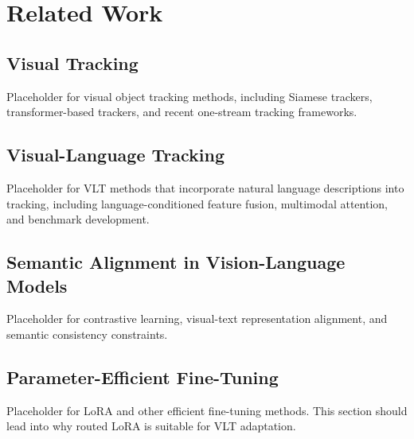 \section{Related Work}
\subsection{Visual Tracking}
Placeholder for visual object tracking methods, including Siamese trackers, transformer-based trackers, and recent one-stream tracking frameworks.

\subsection{Visual-Language Tracking}
Placeholder for VLT methods that incorporate natural language descriptions into tracking, including language-conditioned feature fusion, multimodal attention, and benchmark development.

\subsection{Semantic Alignment in Vision-Language Models}
Placeholder for contrastive learning, visual-text representation alignment, and semantic consistency constraints.

\subsection{Parameter-Efficient Fine-Tuning}
Placeholder for LoRA and other efficient fine-tuning methods. This section should lead into why routed LoRA is suitable for VLT adaptation.
